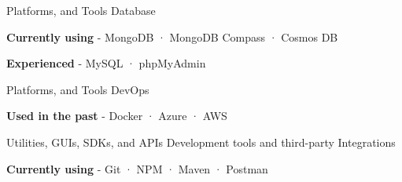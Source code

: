 \begin{cventries}
{    }
  \cventry
    {Platforms, and Tools} %
    {Database} %
    {} %
    {} %
    {
      \begin{cvitems} %
        \item {\textbf{Currently using} \hspace{0.03cm} - \hspace{0.03cm} MongoDB \hspace{0.03cm} · \hspace{0.03cm} MongoDB Compass \hspace{0.03cm} · \hspace{0.03cm} Cosmos DB} %
        \item {\textbf{Experienced} \hspace{0.03cm} - \hspace{0.03cm} MySQL \hspace{0.03cm} · \hspace{0.03cm} phpMyAdmin \\} %
      \end{cvitems}
    }
  \cventry
    {Platforms, and Tools} %
    {DevOps} %
    {} %
    {} %
    {
      \begin{cvitems} %
        \item {\textbf{Used in the past} \hspace{0.03cm} - \hspace{0.03cm} Docker \hspace{0.03cm} · \hspace{0.03cm} Azure \hspace{0.03cm} · \hspace{0.03cm} AWS \\} %
      \end{cvitems}
    }
  \cventry
    {Utilities, GUIs, SDKs, and APIs} %
    {Development tools and third-party Integrations} %
    {} %
    {} %
    {
      \begin{cvitems} %
        \item {\textbf{Currently using} \hspace{0.03cm} - \hspace{0.03cm} Git \hspace{0.03cm} · \hspace{0.03cm} NPM \hspace{0.03cm} · \hspace{0.03cm} Maven \hspace{0.03cm} · \hspace{0.03cm} Postman} %

\end{cvitems}}
\end{cventries}
